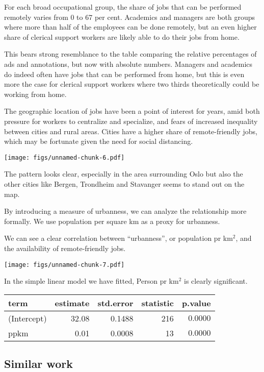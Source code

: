 \documentclass[11pt,]{article}
\begin{document}
For each broad occupational group, the share of jobs that can be
performed remotely varies from 0 to 67 per cent. Academics and managers
are both groups where more than half of the employees can be done
remotely, but an even higher share of clerical support workers are
likely able to do their jobs from home.

This bears strong resemblance to the table comparing the relative
percentages of ads and annotations, but now with absolute numbers.
Managers and academics do indeed often have jobs that can be performed
from home, but this is even more the case for clerical support workers
where two thirds theoretically could be working from home.

The geographic location of jobs have been a point of interest for years,
amid both pressure for workers to centralize and specialize, and fears
of increased inequality between cities and rural areas. Cities have a
higher share of remote-friendly jobs, which may be fortunate given the
need for social distancing.

\texttt{[image: figs/unnamed-chunk-6.pdf]}

The pattern looks clear, especially in the area surrounding Oslo but
also the other cities like Bergen, Trondheim and Stavanger seems to
stand out on the map.

By introducing a measure of urbanness, we can analyze the relationship
more formally. We use population per square km as a proxy for urbanness.

We can see a clear correlation between ``urbanness'', or population pr
km\(^2\), and the availability of remote-friendly jobs.

\texttt{[image: figs/unnamed-chunk-7.pdf]}

In the simple linear model we have fitted, Person pr km\(^2\) is clearly
significant.

\captionsetup[table]{labelformat=empty,skip=1pt}
\begin{longtable}{lrrrr}
\toprule
term & estimate & std.error & statistic & p.value \\ 
\midrule
(Intercept) & 32.08 & 0.1488 & 216 & $0.0000$ \\ 
ppkm & 0.01 & 0.0008 & 13 & $0.0000$ \\ 
\bottomrule
\end{longtable}

\hypertarget{similar-work}{%
\subsection{Similar work}\label{similar-work}}
\end{document}

